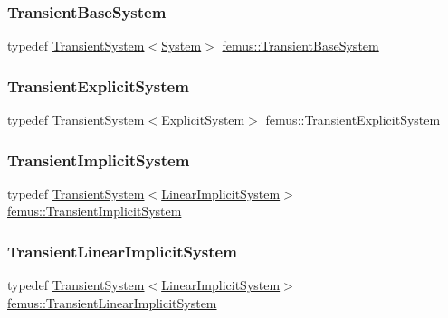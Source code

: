\subsubsection{\texorpdfstring{Transient\+Base\+System}{TransientBaseSystem}}
{\footnotesize\ttfamily typedef \mbox{\hyperlink{classfemus_1_1_transient_system}{Transient\+System}}$<$\mbox{\hyperlink{classfemus_1_1_system}{System}}$>$ \mbox{\hyperlink{namespacefemus_abe2c25355d84d2a659e9f8e952a58062}{femus\+::\+Transient\+Base\+System}}}

\mbox{\label{namespacefemus_acaff987f3f3f11fb7d5961f1256f339c}} 
\subsubsection{\texorpdfstring{Transient\+Explicit\+System}{TransientExplicitSystem}}
{\footnotesize\ttfamily typedef \mbox{\hyperlink{classfemus_1_1_transient_system}{Transient\+System}}$<$\mbox{\hyperlink{classfemus_1_1_explicit_system}{Explicit\+System}}$>$ \mbox{\hyperlink{namespacefemus_acaff987f3f3f11fb7d5961f1256f339c}{femus\+::\+Transient\+Explicit\+System}}}

\mbox{\label{namespacefemus_af881f9d0784fc3645b2eaeb0da265bed}} 
\subsubsection{\texorpdfstring{Transient\+Implicit\+System}{TransientImplicitSystem}}
{\footnotesize\ttfamily typedef \mbox{\hyperlink{classfemus_1_1_transient_system}{Transient\+System}}$<$\mbox{\hyperlink{classfemus_1_1_linear_implicit_system}{Linear\+Implicit\+System}}$>$ \mbox{\hyperlink{namespacefemus_af881f9d0784fc3645b2eaeb0da265bed}{femus\+::\+Transient\+Implicit\+System}}}

\mbox{\label{namespacefemus_a54c4ce2e1808fb027338a05a48a2cbbc}} 
\subsubsection{\texorpdfstring{Transient\+Linear\+Implicit\+System}{TransientLinearImplicitSystem}}
{\footnotesize\ttfamily typedef \mbox{\hyperlink{classfemus_1_1_transient_system}{Transient\+System}}$<$\mbox{\hyperlink{classfemus_1_1_linear_implicit_system}{Linear\+Implicit\+System}}$>$ \mbox{\hyperlink{namespacefemus_a54c4ce2e1808fb027338a05a48a2cbbc}{femus\+::\+Transient\+Linear\+Implicit\+System}}}

